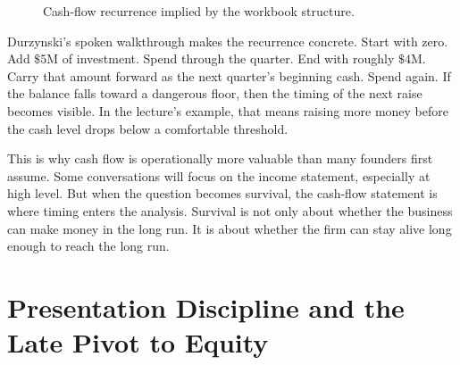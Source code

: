 \begin{figure}[t]
\centering
{}
\caption{Cash-flow recurrence implied by the workbook structure.}
\end{figure}

Durzynski's spoken walkthrough makes the recurrence concrete. Start with zero. Add \(\$5\text{M}\) of investment. Spend through the quarter. End with roughly \(\$4\text{M}\). Carry that amount forward as the next quarter's beginning cash. Spend again. If the balance falls toward a dangerous floor, then the timing of the next raise becomes visible. In the lecture's example, that means raising more money before the cash level drops below a comfortable threshold.

This is why cash flow is operationally more valuable than many founders first assume. Some conversations will focus on the income statement, especially at high level. But when the question becomes survival, the cash-flow statement is where timing enters the analysis. Survival is not only about whether the business can make money in the long run. It is about whether the firm can stay alive long enough to reach the long run.

\section{Presentation Discipline and the Late Pivot to Equity}

